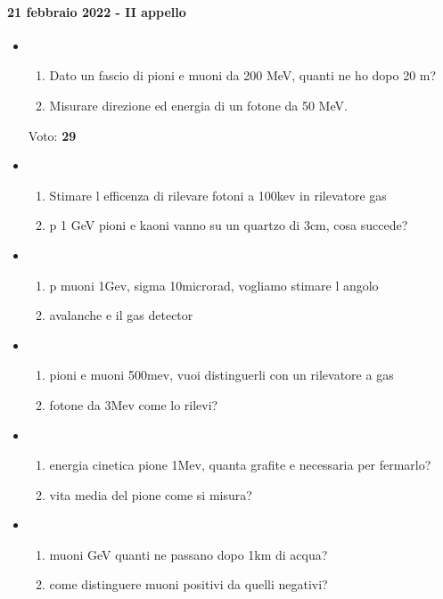 \documentclass[../main.tex]{subfiles}
\begin{document}
\paragraph{21 febbraio 2022 - II appello}
\begin{itemize}
\item \begin{enumerate}
    \item Dato un fascio di pioni e muoni da 200 MeV, quanti ne ho dopo 20 m?\\
   \item Misurare direzione ed energia di un fotone da 50 MeV.
\end{enumerate}
Voto: {\bf 29}
\item \begin{enumerate}
    \item Stimare l efficenza di rilevare fotoni a 100kev in rilevatore gas\\
   \item p 1 GeV pioni e kaoni vanno su un quartzo di 3cm, cosa succede?
\end{enumerate}
\item \begin{enumerate}
    \item p muoni 1Gev, sigma 10microrad, vogliamo stimare l angolo\\
   \item avalanche e il gas detector
\end{enumerate}
\item \begin{enumerate}
    \item pioni e muoni 500mev, vuoi distinguerli con un rilevatore a gas\\
   \item fotone da 3Mev come lo rilevi?
\end{enumerate}
\item \begin{enumerate}
    \item energia cinetica pione 1Mev, quanta grafite e necessaria per fermarlo?\\
   \item vita media del pione come si misura?
\end{enumerate}
\item \begin{enumerate}
    \item muoni GeV quanti ne passano dopo 1km di acqua?\\
   \item come distinguere muoni positivi da quelli negativi?

\end{enumerate}
\end{itemize}
\end{document}
